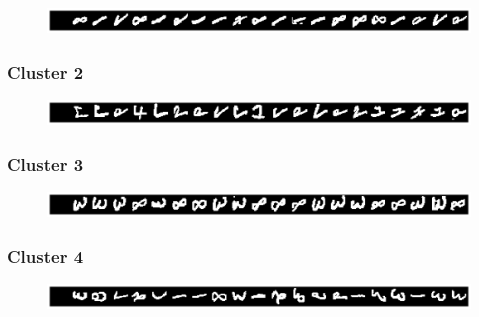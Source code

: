 \documentclass{article}
\begin{document}
	\begin{figure}[h!]
		\begin{center} 
			\includegraphics[scale=.6]{grp1.eps} 
		\end{center}  
		\label{fig:M2}
	\end{figure}
	
	\subsubsection*{Cluster 2}
	
	\begin{figure}[h!]
		\begin{center} 
			\includegraphics[scale=.6]{grp2.eps} 
		\end{center}  
		\label{fig:M3}
	\end{figure}
	
	\subsubsection*{Cluster 3}
	
	\begin{figure}[h!]
		\begin{center} 
			\includegraphics[scale=.6]{grp3.eps} 
		\end{center}  
		\label{fig:M4}
	\end{figure}
	
	\subsubsection*{Cluster 4}
	
	\begin{figure}[h!]
		\begin{center} 
			\includegraphics[scale=.6]{grp4.eps} 
		\end{center}  
		\label{fig:M5}
	\end{figure}
	
\end{document}
